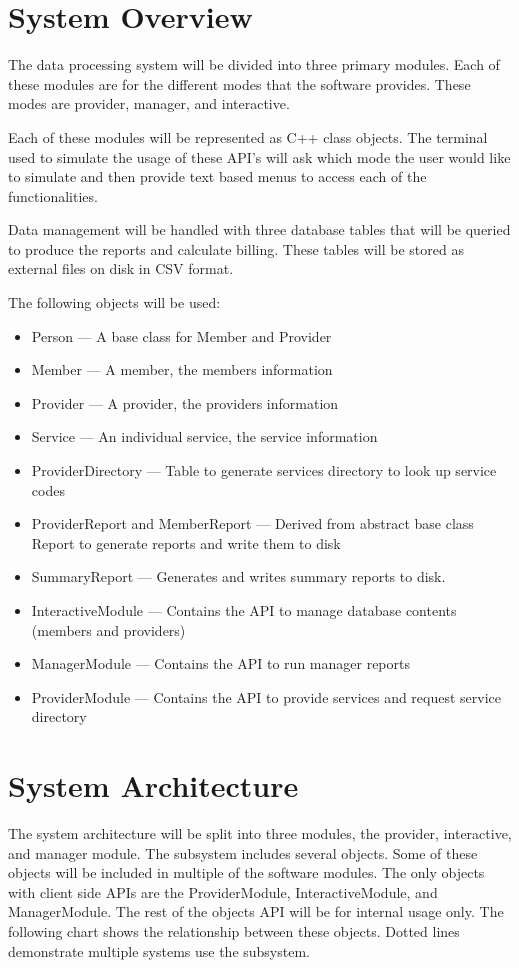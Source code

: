 \documentclass{article}
\begin{document}
\section{System Overview}
The data processing system will be divided into three primary modules. Each of these modules are for the different modes that the software provides. These modes are provider, manager, and interactive.

Each of these modules will be represented as C++ class objects. The terminal used to simulate the usage of these API’s will ask which mode the user would like to simulate and then provide text based menus to access each of the functionalities.

Data management will be handled with three database tables that will be queried to produce the reports and calculate billing. These tables will be stored as external files on disk in CSV format.

The following objects will be used:
\begin{itemize}
   \item Person --- A base class for Member and Provider
   \item Member --- A member, the members information
   \item Provider --- A provider, the providers information
   \item Service --- An individual service, the service information
   \item ProviderDirectory --- Table to generate services directory to look up service codes
   \item ProviderReport and MemberReport --- Derived from abstract base class Report to generate reports and write them to disk
   \item SummaryReport --- Generates and writes summary reports to disk.
   \item InteractiveModule --- Contains the API to manage database contents (members and providers)
   \item ManagerModule --- Contains the API to run manager reports
   \item ProviderModule --- Contains the API to provide services and request service directory
\end{itemize}

\section{System Architecture}
The system architecture will be split into three modules, the provider, interactive, and manager module. The subsystem includes several objects. Some of these objects will be included in multiple of the software modules. The only objects with client side APIs are the ProviderModule, InteractiveModule, and ManagerModule. The rest of the objects API will be for internal usage only. The following chart shows the relationship between these objects. Dotted lines demonstrate multiple systems use the subsystem.
\end{document}
